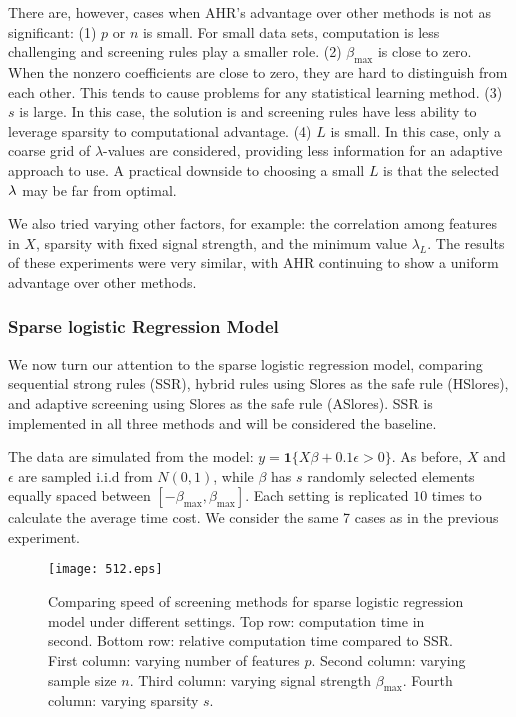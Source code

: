 There are, however, cases when AHR's advantage over other methods is not as significant: (1) $p$ or $n$ is small. For small data sets, computation is less challenging and screening rules play a smaller role. (2) $\beta_{\max}$ is close to zero. When the nonzero coefficients are close to zero, they are hard to distinguish from each other. This tends to cause problems for any statistical learning method. (3) $s$ is large. In this case, the solution is  and screening rules have less ability to leverage sparsity to computational advantage. (4) $L$ is small. In this case, only a coarse grid of $\lambda$-values are considered, providing less information for an adaptive approach to use. A practical downside to choosing a small $L$ is that the selected $\lambda$ may be far from optimal.

We also tried varying other factors, for example: the correlation among features in $X$, sparsity with fixed signal strength, and the minimum value $\lambda_L$. The results of these experiments were very similar, with AHR continuing to show a uniform advantage over other methods.

\subsubsection{Sparse logistic Regression Model}

We now turn our attention to the sparse logistic regression model, comparing sequential strong rules (SSR), hybrid rules using Slores as the safe rule (HSlores), and adaptive screening using Slores as the safe rule (ASlores). SSR is implemented in all three methods and will be considered the baseline.

The data are simulated from the model: $y=\mathbf{1}\{X\beta+0.1\epsilon >0\}$. As before, $X$ and $\epsilon$ are sampled i.i.d from $N(0,1)$, while $\beta$ has $s$ randomly selected elements equally spaced between $[-\beta_{\max},\beta_{\max}]$. Each setting is replicated $10$ times to calculate the average time cost. We consider the same 7 cases as in the previous experiment.

\begin{figure}[ht]
    \centering
    \texttt{[image: 512.eps]}    \caption{Comparing speed of screening methods for sparse logistic regression model under different settings. Top row: computation time in second. Bottom row: relative computation time compared to SSR. First column: varying number of features $p$. Second column: varying sample size $n$. Third column: varying signal strength $\beta_{\max}$. Fourth column: varying sparsity $s$.}
    \label{fig:5.1.2a}
\end{figure}

